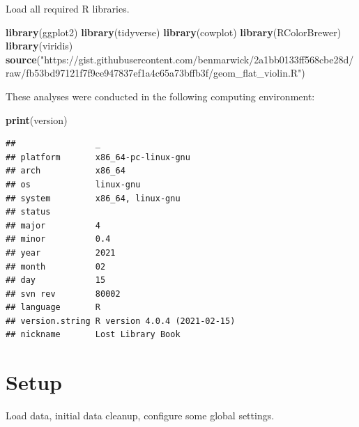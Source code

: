 \documentclass[]{book}
\newenvironment{Shaded}{\begin{snugshade}}{\end{snugshade}}
\newcommand{\KeywordTok}[1]{\textcolor[rgb]{0.13,0.29,0.53}{\textbf{#1}}}
\newcommand{\NormalTok}[1]{#1}
\newcommand{\StringTok}[1]{\textcolor[rgb]{0.31,0.60,0.02}{#1}}
\begin{document}
Load all required R libraries.

\begin{Shaded}
\begin{Highlighting}[]
\KeywordTok{library}\NormalTok{(ggplot2)}
\KeywordTok{library}\NormalTok{(tidyverse)}
\KeywordTok{library}\NormalTok{(cowplot)}
\KeywordTok{library}\NormalTok{(RColorBrewer)}
\KeywordTok{library}\NormalTok{(viridis)}
\KeywordTok{source}\NormalTok{(}\StringTok{"https://gist.githubusercontent.com/benmarwick/2a1bb0133ff568cbe28d/raw/fb53bd97121f7f9ce947837ef1a4c65a73bffb3f/geom_flat_violin.R"}\NormalTok{)}
\end{Highlighting}
\end{Shaded}

These analyses were conducted in the following computing environment:

\begin{Shaded}
\begin{Highlighting}[]
\KeywordTok{print}\NormalTok{(version)}
\end{Highlighting}
\end{Shaded}

\begin{verbatim}
##                _                           
## platform       x86_64-pc-linux-gnu         
## arch           x86_64                      
## os             linux-gnu                   
## system         x86_64, linux-gnu           
## status                                     
## major          4                           
## minor          0.4                         
## year           2021                        
## month          02                          
## day            15                          
## svn rev        80002                       
## language       R                           
## version.string R version 4.0.4 (2021-02-15)
## nickname       Lost Library Book
\end{verbatim}

\hypertarget{setup-3}{%
\section{Setup}\label{setup-3}}

Load data, initial data cleanup, configure some global settings.
\end{document}
